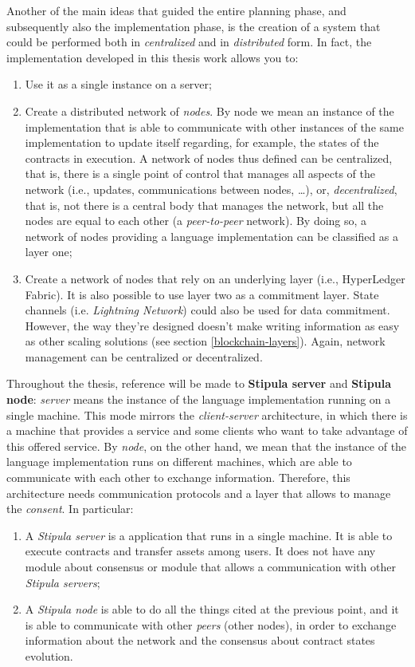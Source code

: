 Another of the main ideas that guided the entire planning phase, and subsequently also the implementation 
phase, is the creation of a system that could be performed both in \textit{centralized} and in 
\textit{distributed} form. In fact, the implementation developed in this thesis work allows you to:
\begin{enumerate}
	\item Use it as a single instance on a server;
	\item Create a distributed network of \textit{nodes}. By node we mean an instance of the implementation 
	that is able to communicate with other instances of the same implementation to update itself regarding, 
	for example, the states of the contracts in execution. A network of nodes thus defined can be 
	centralized, that is, there is a single point of control that manages all aspects of the network (i.e., 
	updates, communications between nodes, \dots), or, \textit{decentralized}, that is, not there is a 
	central body that manages the network, but all the nodes are equal to each other (a \textit{peer-to-peer} 
	network). By doing so, a network of nodes providing a language implementation can be classified as a 
	layer one;
	\item Create a network of nodes that rely on an underlying layer (i.e., HyperLedger Fabric). It is also 
	possible to use layer two as a commitment layer. State channels (i.e. \textit{Lightning Network}) could 
	also be used for data commitment. However, the way they're designed doesn't make writing information as 
	easy as other scaling solutions (see section \ref{blockchain-layers}). Again, network management can be 
	centralized or decentralized.
\end{enumerate}

Throughout the thesis, reference will be made to \textbf{Stipula server} and \textbf{Stipula node}: 
\textit{server} means the instance of the language implementation running on a single machine. This mode 
mirrors the \textit{client-server} architecture, in which there is a machine that provides a service and 
some clients who want to take advantage of this offered service. By \textit{node}, on the other hand, we 
mean that the instance of the language implementation runs on different machines, which are able to 
communicate with each other to exchange information. Therefore, this architecture needs communication 
protocols and a layer that allows to manage the \textit{consent}. In particular:
\begin{enumerate}
	\item A \textit{Stipula server} is a application that runs in a single machine. It is able to execute 
	contracts and transfer assets among users. It does not have any module about consensus or module that 
	allows a communication with other \textit{Stipula servers};
	\item A \textit{Stipula node} is able to do all the things cited at the previous point, and it is able 
	to communicate with other \textit{peers} (other nodes), in order to exchange information about the 
	network and the consensus about contract states evolution.
\end{enumerate}

